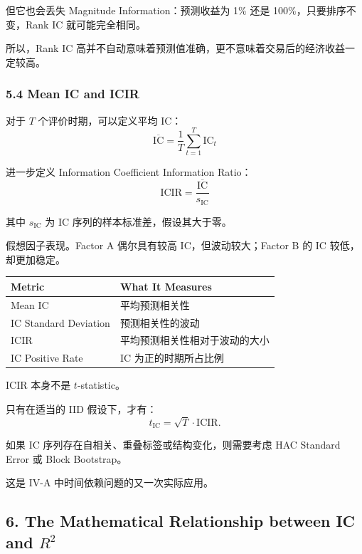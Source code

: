 但它也会丢失 Magnitude Information：预测收益为 1\% 还是 100\%，只要排序不变，Rank IC 就可能完全相同。

所以，Rank IC 高并不自动意味着预测值准确，更不意味着交易后的经济收益一定较高。

\hypertarget{part-4-63-0001-mean-ic-and-icir}{%
\subsubsection{5.4 Mean IC and ICIR}\label{part-4-63-0001-mean-ic-and-icir}}

对于 \(T\) 个评价时期，可以定义平均 IC：
\[\boxed{
\overline{\mathrm{IC}}
=
\frac1T\sum_{t=1}^{T}\mathrm{IC}_t
}\]

进一步定义 Information Coefficient Information Ratio：
\[\boxed{
\mathrm{ICIR}
=
\frac{
\overline{\mathrm{IC}}
}{
s_{\mathrm{IC}}
}
}\]

其中 \(s_{\mathrm{IC}}\) 为 IC 序列的样本标准差，假设其大于零。


假想因子表现。Factor A 偶尔具有较高 IC，但波动较大；Factor B 的 IC 较低，却更加稳定。

\begin{readertable}
\begin{longtable}[]{@{}
  >{\raggedright\arraybackslash}p{}
  >{\raggedright\arraybackslash}p{}@{}}
\toprule
Metric & What It Measures \\
\midrule
\endhead
Mean IC & 平均预测相关性 \\
IC Standard Deviation & 预测相关性的波动 \\
ICIR & 平均预测相关性相对于波动的大小 \\
IC Positive Rate & IC 为正的时期所占比例 \\
\bottomrule
\end{longtable}
\end{readertable}

ICIR 本身不是 \(t\)-statistic。

只有在适当的 IID 假设下，才有：
\[t_{\mathrm{IC}}
=
\sqrt T\cdot\mathrm{ICIR}.\]

如果 IC 序列存在自相关、重叠标签或结构变化，则需要考虑 HAC Standard Error 或 Block Bootstrap。

这是 IV-A 中时间依赖问题的又一次实际应用。

\hypertarget{part-4-63-0001-the-mathematical-relationship-between-ic-and-r2}{%
\subsection{\texorpdfstring{6. The Mathematical Relationship between IC and \(R^2\)}{6. The Mathematical Relationship between IC and R\^{}2}}\label{part-4-63-0001-the-mathematical-relationship-between-ic-and-r2}}

